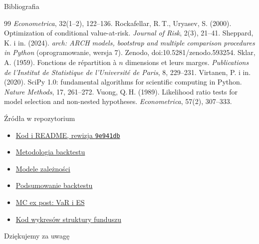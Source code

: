 \documentclass[aspectratio=169,11pt]{beamer}
\newcommand{\repo}{https://github.com/michalmarchwiak/bsc-project}
\newcommand{\rev}{9e941db56fde866672b262f5f6725268ce58feb7}
\begin{document}
\begin{frame}[allowframebreaks]{Bibliografia}
\begin{thebibliography}{99}
      \emph{Econometrica}, 32(1--2), 122--136.
      Rockafellar, R.\,T., Uryasev, S. (2000). Optimization of conditional
      value-at-risk. \emph{Journal of Risk}, 2(3), 21--41.
      Sheppard, K. i in. (2024). \emph{arch: ARCH models, bootstrap and
      multiple comparison procedures in Python} (oprogramowanie, wersja 7).
      Zenodo, doi:10.5281/zenodo.593254.
      Sklar, A. (1959). Fonctions de répartition à \(n\) dimensions et leurs
      marges. \emph{Publications de l'Institut de Statistique de
      l'Université de Paris}, 8, 229--231.
      Virtanen, P. i in. (2020). SciPy 1.0: fundamental algorithms for
      scientific computing in Python. \emph{Nature Methods}, 17, 261--272.
      Vuong, Q.\,H. (1989). Likelihood ratio tests for model selection and
      non-nested hypotheses. \emph{Econometrica}, 57(2), 307--333.
  \end{thebibliography}
\end{frame}

\begin{frame}{Źródła w repozytorium}
  \begin{itemize}
    \item \href{\repo/tree/\rev}{Kod i README, rewizja \texttt{9e941db}}
    \item \href{\repo/blob/\rev/docs/backtest.md}{Metodologia backtestu}
    \item \href{\repo/blob/\rev/docs/dependence_model.md}{Modele zależności}
    \item \href{\repo/blob/\rev/artifacts/reports/backtest_summary.md}
      {Podsumowanie backtestu}
    \item \href{\repo/blob/\rev/artifacts/reports/es_mc.md}
      {MC ex post: VaR i ES}
    \item \href{\repo/blob/main/pipelines/composition_figures.py}
      {Kod wykresów struktury funduszu}
  \end{itemize}
  \vfill
  {\color{Teal}\Large Dziękujemy za uwagę}
\end{frame}
\end{document}
